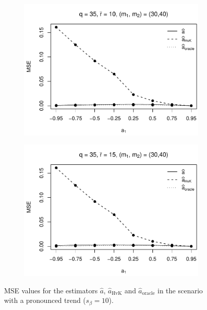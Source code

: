 \begin{figure}[p]
\begin{subfigure}[b]{0.45\textwidth}
\includegraphics[width=\textwidth]{Plots/Robustness/MSE_a1_T=500_slope=10_(q,K1,K2,M1,M2)=(35,2,10,30,40).pdf}
\end{subfigure}
\hspace{0.25cm}
\begin{subfigure}[b]{0.45\textwidth}
\includegraphics[width=\textwidth]{Plots/Robustness/MSE_a1_T=500_slope=10_(q,K1,K2,M1,M2)=(35,2,15,30,40).pdf}
\end{subfigure}
\caption{MSE values for the estimators $\widehat{a}$, $\widehat{a}_{\text{HvK}}$ and $\widehat{a}_{\text{oracle}}$ in the scenario with a pronounced trend ($s_\beta=10$).}\label{fig:MSE_slope10_AR_robust} 
\end{figure}


